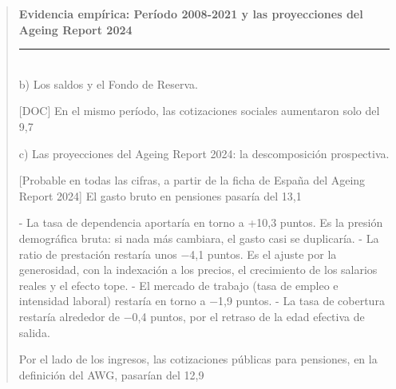 \documentclass[10pt,a4paper]{article}
\newenvironment{specialblock}[1]{%
      \begin{quote} %
      \small %
      \noindent\textbf{#1}\\[-0.3em] %
      \rule{\linewidth}{0.4pt}\\[0.6em]}{
      \end{quote}}
\begin{document}
\begin{specialblock}{\textbf{Evidencia empírica:} Período 2008-2021 y las proyecciones del Ageing Report 2024}
    b) Los saldos y el Fondo de Reserva.
    
    [DOC] En el mismo período, las cotizaciones sociales aumentaron solo del 9,7%
    
    c) Las proyecciones del Ageing Report 2024: la descomposición prospectiva.
    
    [Probable en todas las cifras, a partir de la ficha de España del Ageing Report 2024] El gasto bruto en pensiones pasaría del 13,1%
    
    - La tasa de dependencia aportaría en torno a +10,3 puntos. Es la presión demográfica bruta: si nada más cambiara, el gasto casi se duplicaría.
    - La ratio de prestación restaría unos −4,1 puntos. Es el ajuste por la generosidad, con la indexación a los precios, el crecimiento de los salarios reales y el efecto tope.
    - El mercado de trabajo (tasa de empleo e intensidad laboral) restaría en torno a −1,9 puntos.
    - La tasa de cobertura restaría alrededor de −0,4 puntos, por el retraso de la edad efectiva de salida.
    
    Por el lado de los ingresos, las cotizaciones públicas para pensiones, en la definición del AWG, pasarían del 12,9%
    

\end{specialblock}
\end{document}
